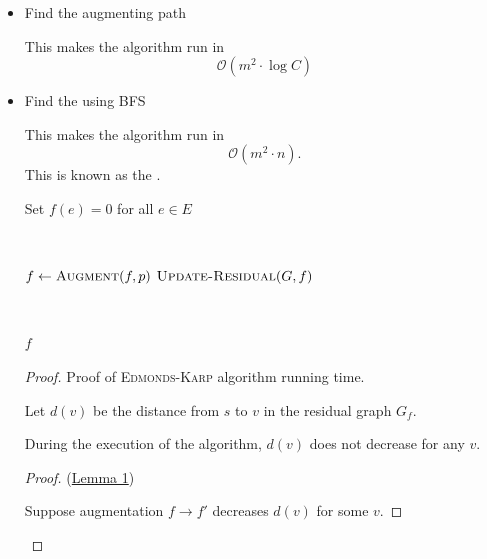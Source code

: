 \begin{itemize}
    \item Find the  augmenting path 
    
    This makes the algorithm run in  \[
        \mathcal{O}(m^2 \cdot \log C)
    \]

    \item Find the  using BFS 
    
    This makes the algorithm run in  \[
        \mathcal{O}(m^2 \cdot n).
    \] This is known as the .

    \begin{algorithm}[ht!]
        \begin{algorithmic}[1]
                \State Set $f(e) = 0$ for all $e \in E$

                {~~~}

                    \State $f \gets \Call{Augment}{f, p}$
                    \State $\Call{Update-Residual}{G, f}$
                \EndWhile

                {~~~}

                \State \Return $f$
            \EndFunction
        \end{algorithmic}
    \end{algorithm}
    
    \begin{proof}
        Proof of \textsc{Edmonds-Karp} algorithm running time. 

        Let $d(v)$ be the distance from $s$ to $v$ in the residual graph $G_f$.

        \begin{lemma*}[1]\label{lem:edmonds-karp-1}
            During the execution of the algorithm, $d(v)$ does not decrease for any $v$.
        \end{lemma*}

        \begin{proof}(\hyperref[lem:edmonds-karp-1]{Lemma 1})

            Suppose augmentation $f \to f'$ decreases $d(v)$ for some $v$.


\end{proof}
\end{proof}
\end{itemize}
